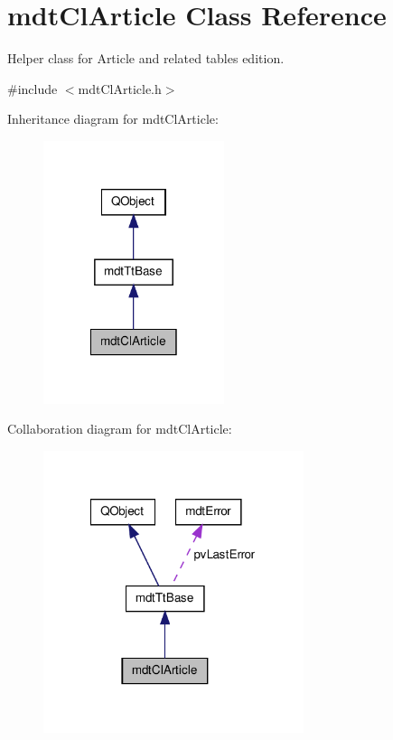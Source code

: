 \hypertarget{classmdt_cl_article}{\section{mdt\-Cl\-Article Class Reference}
\label{classmdt_cl_article}
}


Helper class for Article and related tables edition.  




{\ttfamily \#include $<$mdt\-Cl\-Article.\-h$>$}



Inheritance diagram for mdt\-Cl\-Article\-:\nopagebreak
\begin{figure}[H]
\begin{center}
\leavevmode
\includegraphics[width=150pt]{classmdt_cl_article__inherit__graph}
\end{center}
\end{figure}


Collaboration diagram for mdt\-Cl\-Article\-:\nopagebreak
\begin{figure}[H]
\begin{center}
\leavevmode
\includegraphics[width=216pt]{classmdt_cl_article__coll__graph}
\end{center}
\end{figure}

